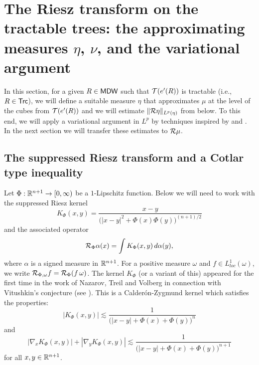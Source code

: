 
\section{The Riesz transform on the tractable trees: the approximating measures \texorpdfstring{$\eta$}{eta}, \texorpdfstring{$\nu$}{nu}, and the variational argument}\label{sec6}

In this section,
for a given $R\in{\mathsf{MDW}}$ such that ${\mathcal T}(e'(R))$ is tractable (i.e., $R\in{\mathsf{Trc}}$),
we will define a suitable measure $\eta$ that approximates $\mu$ at the level of the cubes from
${\mathcal T}(e'(R))$ and we will estimate $\|{\mathcal R}\eta\|_{L^p(\eta)}$ from below. To this end,
we will apply a variational argument in $L^p$ by techniques inspired by 
\cite{Reguera-Tolsa} and \cite{JNRT}.  In the next section we will transfer these
estimates to ${\mathcal R}\mu$.




\subsection{The suppressed Riesz transform and a Cotlar type inequality}\label{sec6.1}


Let $\Phi:{\mathbb R}^{n+1}\to[0,\infty)$ be a $1$-Lipschitz function.
Below we will need to work with the suppressed Riesz kernel
\begin{equation}\label{eqsuppressed}
K_\Phi(x,y) = \frac{x-y}{\bigl (|x-y|^2+\Phi(x)\Phi(y)\bigr)^{(n+1)/2}}
\end{equation}
and the associated operator 
$${\mathcal R}_\Phi\alpha(x) =\int K_\Phi(x,y)\,d\alpha(y),$$
where $\alpha$ is a signed measure in ${\mathbb R}^{n+1}$.
For a positive measure $\omega$ and $f\in L^1_{loc}(\omega)$, we write ${\mathcal R}_{\Phi,\omega} f = {\mathcal R}_\Phi (f\,\omega)$.
The kernel $K_\Phi$ (or a variant of this) appeared for the first
time in the work of Nazarov, Treil and Volberg in connection with Vitushkin's conjecture (see
\cite{Volberg}). 
This is a Calder\'on-Zygmund kernel which satisfies the properties:
\begin{equation}\label{eqkafi1}
|K_\Phi(x,y)|\lesssim \frac1{\big(|x-y| + \Phi(x) + \Phi(y)\big)^n}
\end{equation}
and
\begin{equation}\label{eqkafi2}
|\nabla_x K_\Phi(x,y)|+ |\nabla_y K_\Phi(x,y)|
\lesssim \frac1{\big(|x-y| + \Phi(x) + \Phi(y)\big)^{n+1}}
\end{equation}
for all $x,y\in{\mathbb R}^{n+1}$.

